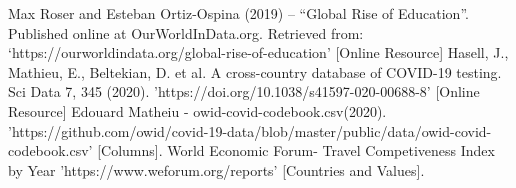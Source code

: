 \documentclass[conference]{IEEEtran}
\begin{document}
\begin{thebibliography}{00}
 Max Roser and Esteban Ortiz-Ospina (2019) – “Global Rise of Education”. Published online at OurWorldInData.org. Retrieved from: ‘https://ourworldindata.org/global-rise-of-education’ [Online Resource]
 Hasell, J., Mathieu, E., Beltekian, D. et al. A cross-country database of COVID-19 testing. Sci Data 7, 345 (2020). 'https://doi.org/10.1038/s41597-020-00688-8' [Online Resource]
 Edouard Matheiu - owid-covid-codebook.csv(2020). 'https://github.com/owid/covid-19-data/blob/master/public/data/owid-covid-codebook.csv' [Columns].
 World Economic Forum- Travel Competiveness Index by Year 'https://www.weforum.org/reports' [Countries and Values].
\end{thebibliography}
\vspace{12pt}
\color{red}
\end{document}

